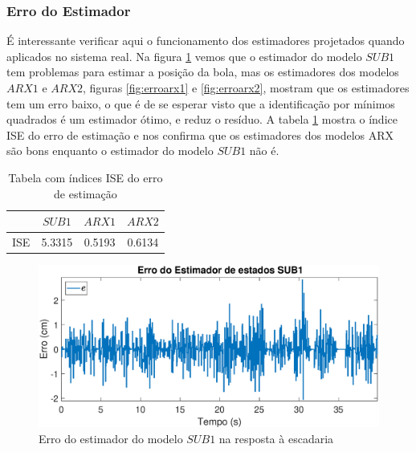 \subsubsection{Erro do Estimador} \label{erroest}
 É interessante verificar aqui o funcionamento dos estimadores projetados quando aplicados no sistema real. Na figura \ref{fig:errosub1} vemos que o estimador do modelo $SUB1$ tem problemas para estimar a posição da bola, mas os estimadores dos modelos $ARX1$ e $ARX2$, figuras \ref{fig:erroarx1} e \ref{fig:erroarx2}, mostram que os estimadores tem um erro baixo, o que é de se esperar visto que a identificação por mínimos quadrados é um estimador ótimo, e reduz o resíduo. A tabela \ref{tb:iseestim} mostra o índice ISE do erro de estimação e nos confirma que os estimadores dos modelos ARX são bons enquanto o estimador do modelo $SUB1$ não é.
 
 \begin{table}[htb]
 	\centering
 	\begin{tabular}{|c|c|c|c|}
 		\hline 
 		& $SUB1$ & $ARX1$ & $ARX2$ \\ 
 		\hline 
 		ISE & 5.3315 & 0.5193 & 0.6134 \\ 
 		\hline 
 	\end{tabular} 
 \caption{Tabela com índices ISE do erro de estimação}
 \label{tb:iseestim}
 \end{table}
 
 
\begin{figure}[htb]
	\centering
	\includegraphics[width=1\linewidth]{errosub1}
	\caption[Erro do estimador do modelo $SUB1$ na resposta à escadaria]{Erro do estimador do modelo $SUB1$ na resposta à escadaria}
	\label{fig:errosub1}
\end{figure}


